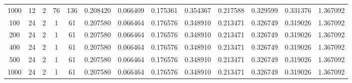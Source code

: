 \begin{table}[h]
\begin{tabular}{ccccccccccccc}
1000 & 12 & 2 & 76 & 136 & 0.208420 & 0.066409 & 0.175361 & 0.354367 & 0.217588 & 0.329599 & 0.331376 & 1.367092 \\
100 & 24 & 2 & 1 & 61 & 0.207580 & 0.066464 & 0.176576 & 0.348910 & 0.213471 & 0.326749 & 0.319026 & 1.367092 \\
200 & 24 & 2 & 1 & 61 & 0.207580 & 0.066464 & 0.176576 & 0.348910 & 0.213471 & 0.326749 & 0.319026 & 1.367092 \\
400 & 24 & 2 & 1 & 61 & 0.207580 & 0.066464 & 0.176576 & 0.348910 & 0.213471 & 0.326749 & 0.319026 & 1.367092 \\
500 & 24 & 2 & 1 & 61 & 0.207580 & 0.066464 & 0.176576 & 0.348910 & 0.213471 & 0.326749 & 0.319026 & 1.367092 \\
1000 & 24 & 2 & 1 & 61 & 0.207580 & 0.066464 & 0.176576 & 0.348910 & 0.213471 & 0.326749 & 0.319026 & 1.367092 \\
\bottomrule
\end{tabular}
\end{table}
